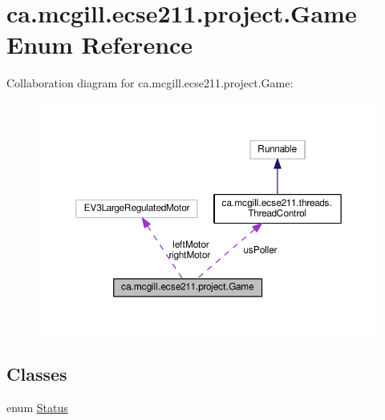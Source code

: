 \hypertarget{enumca_1_1mcgill_1_1ecse211_1_1project_1_1_game}{}\section{ca.\+mcgill.\+ecse211.\+project.\+Game Enum Reference}
\label{enumca_1_1mcgill_1_1ecse211_1_1project_1_1_game}


Collaboration diagram for ca.\+mcgill.\+ecse211.\+project.\+Game\+:
\nopagebreak
\begin{figure}[H]
\begin{center}
\leavevmode
\includegraphics[width=350pt]{enumca_1_1mcgill_1_1ecse211_1_1project_1_1_game__coll__graph}
\end{center}
\end{figure}
\subsection*{Classes}
\begin{DoxyCompactItemize}
\item 
enum \hyperlink{enumca_1_1mcgill_1_1ecse211_1_1project_1_1_game_1_1_status}{Status}
\end{DoxyCompactItemize}

